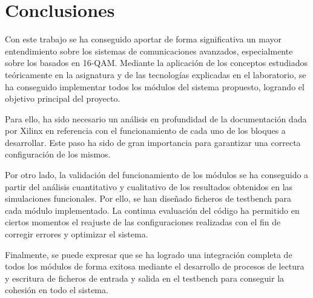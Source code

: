 \chapter{Conclusiones}
\label{section:conclusiones}

Con este trabajo se ha conseguido aportar de forma significativa un mayor entendimiento sobre los sistemas de comunicaciones avanzados, especialmente sobre los basados en 16-QAM. Mediante la aplicación de los conceptos estudiados teóricamente en la asignatura y de las tecnologías explicadas en el laboratorio, se ha conseguido implementar todos los módulos del sistema propuesto, logrando el objetivo principal del proyecto.

\vspace{3mm}

Para ello, ha sido necesario un análisis en profundidad de la documentación dada por Xilinx en referencia con el funcionamiento de cada uno de los bloques a desarrollar. Este paso ha sido de gran importancia para garantizar una correcta configuración de los mismos. 

\vspace{3mm}

Por otro lado, la validación del funcionamiento de los módulos se ha conseguido a partir del análisis cuantitativo y cualitativo de los resultados obtenidos en las simulaciones funcionales. Por ello, se han diseñado ficheros de testbench para cada módulo implementado. La continua evaluación del código ha permitido en ciertos momentos el reajuste de las configuraciones realizadas con el fin de corregir errores y optimizar el sistema.

\vspace{3mm}

Finalmente, se puede expresar que se ha logrado una integración completa  de todos los módulos de forma exitosa mediante el desarrollo de procesos de lectura y escritura de ficheros de entrada y salida en el testbench para conseguir la cohesión en todo el sistema.

